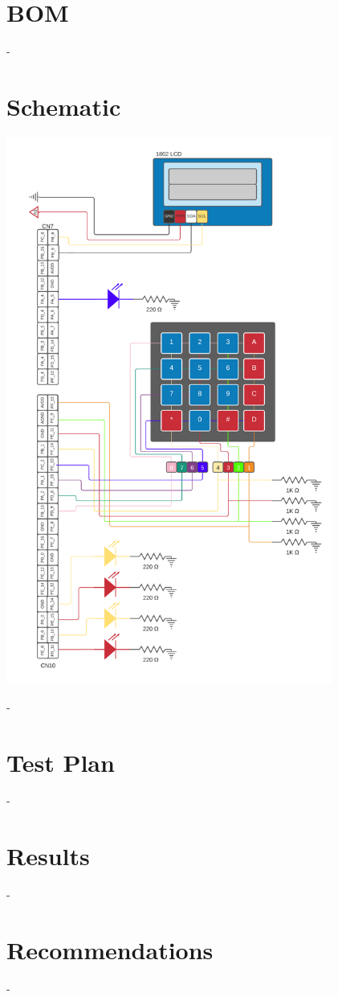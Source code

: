 \documentclass{article}
\begin{document}
\section{BOM}
-
\newline

\section{Schematic}
    \begin{center}
        {\includegraphics[height=18cm]{graphics/CSE321_project2_schematic.png}\centering} 
    \end{center}
    -
\newline

\section{Test Plan}
-
\newline

\section{Results}
-
\newline

\section{Recommendations}
-
\newline
\end{document}
